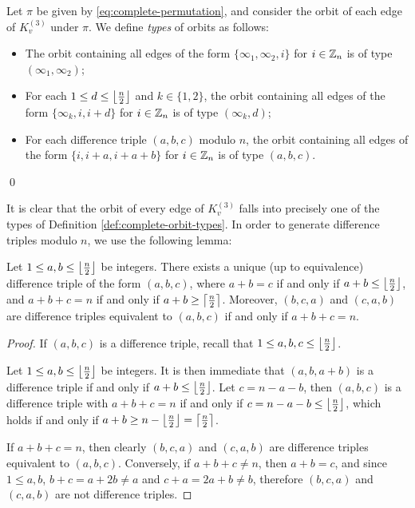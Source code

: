\begin{definition} \label{def:complete-orbit-types}
Let $\pi$ be given by \eqref{eq:complete-permutation}, and consider the orbit of each edge of $K_{v}^{(3)}$ under $\pi$.
We define {\em types} of orbits as follows:

\begin{itemize}
    \item The orbit containing all edges of the form $\{\infty_1, \infty_2, i\}$ for $i \in \mathbb{Z}_n$ is of type $(\infty_1, \infty_2)$;
    \item For each $1 \leq d \leq \left\lfloor \frac{n}{2} \right\rfloor$ and $k \in \{1, 2\}$, the orbit containing all edges of the form $\{\infty_k, i, i+d\}$ for $i \in \mathbb{Z}_n$ is of type $(\infty_k, d)$;
    \item For each difference triple $(a, b, c)$ modulo $n$, the orbit containing all edges of the form $\{i, i+a, i+a+b\}$ for $i \in \mathbb{Z}_n$ is of type $(a, b, c)$.
\end{itemize}
\qed
\end{definition}

It is clear that the orbit of every edge of $K_{v}^{(3)}$ falls into precisely one of the types of Definition \ref{def:complete-orbit-types}.
In order to generate difference triples modulo $n$, we use the following lemma:

\begin{lemma} \label{lem:diff-triple-existence}
Let $1 \leq a,b \leq \left\lfloor \frac{n}{2} \right\rfloor$ be integers.
There exists a unique (up to equivalence) difference triple of the form $(a, b, c)$, where
$a + b = c$ if and only if $a + b \leq \left\lfloor \frac{n}{2} \right\rfloor$, and $a + b + c = n$ if and only if $a + b \geq \left\lceil \frac{n}{2} \right\rceil$.
Moreover, $(b, c, a)$ and $(c, a, b)$ are difference triples equivalent to $(a, b, c)$ if and only if $a + b + c = n$.
\end{lemma}

\begin{proof}
If $(a, b, c)$ is a difference triple, recall that $1 \leq a,b,c \leq \left\lfloor \frac{n}{2} \right\rfloor$.

Let $1 \leq a,b \leq \left\lfloor \frac{n}{2} \right\rfloor$ be integers.
It is then immediate that $(a, b, a+b)$ is a difference triple if and only if $a + b \leq \left\lfloor \frac{n}{2} \right\rfloor$.
Let $c = n-a-b$, then $(a, b, c)$ is a difference triple with $a + b + c = n$ if and only if $c = n - a - b \leq \left\lfloor \frac{n}{2} \right\rfloor$, which holds if and only if $a + b \geq n - \left\lfloor \frac{n}{2} \right\rfloor = \left\lceil \frac{n}{2} \right\rceil$.

If $a + b + c = n$, then clearly $(b, c, a)$ and $(c, a, b)$ are difference triples equivalent to $(a, b, c)$.
Conversely, if $a + b + c \neq n$, then $a + b = c$, and since $1 \leq a,b$, $b + c = a + 2b \neq a$ and $c + a = 2a + b \neq b$, therefore $(b, c, a)$ and $(c, a, b)$ are not difference triples.
\end{proof}

